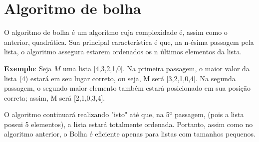 \section{Algoritmo de bolha}
O algoritmo de bolha é um algoritmo cuja complexidade é, assim como o anterior, quadrática. Sua principal característica é que, na n-ésima passagem pela lista, o algoritmo assegura estarem ordenados os n últimos elementos da lista.

\textbf{Exemplo}: Seja $M$ uma lista [4,3,2,1,0].
Na primeira passagem, o maior valor da lista (4) estará em seu lugar correto, ou seja, M será [3,2,1,0,4]. Na segunda passagem, o segundo maior elemento também estará posicionado em sua posição correta; assim, M será [2,1,0,3,4].

O algoritmo continuará realizando "isto" até que, na 5º passagem, (pois a lista possui 5 elementos), a lista estará totalmente ordenada.
Portanto, assim como no algoritmo anterior, o Bolha é eficiente apenas para listas com tamanhos pequenos.
